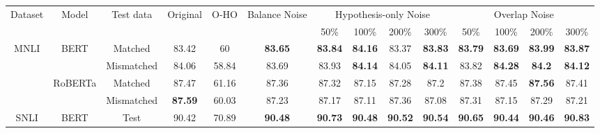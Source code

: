 \begin{table}[]
	\centering
	\scriptsize
\begin{tabular}{|c|c|c|c|c|c|c|c|c|c|c|c|c|c|}
\hline
\multirow{2}{*}{Dataset} & \multirow{2}{*}{Model}   & \multirow{2}{*}{Test data} & \multirow{2}{*}{Original} & \multirow{2}{*}{O-HO} & \multirow{2}{*}{Balance Noise} & \multicolumn{4}{c|}{Hypothesis-only Noise}                        & \multicolumn{4}{c|}{Overlap Noise}                                \\ \cline{7-14} 
                         &                          &                            &                           &                              &                                & 50\%           & 100\%          & 200\%          & 300\%          & 50\%           & 100\%          & 200\%          & 300\%          \\ \hline
\multirow{4}{*}{MNLI}    & \multirow{2}{*}{BERT}    & Matched                    & 83.42                     & 60                           & \textbf{83.65}                 & \textbf{83.84} & \textbf{84.16} & 83.37          & \textbf{83.83} & \textbf{83.79} & \textbf{83.69} & \textbf{83.99} & \textbf{83.87} \\ \cline{3-14} 
                         &                          & Mismatched                 & 84.06                     & 58.84                        & 83.69                          & 83.93          & \textbf{84.14} & 84.05          & \textbf{84.11} & 83.82          & \textbf{84.28} & \textbf{84.2}  & \textbf{84.12} \\ \cline{2-14} 
                         & \multirow{2}{*}{RoBERTa} & Matched                    & 87.47                     & 61.16                        & 87.36                          & 87.32          & 87.15          & 87.28          & 87.2           & 87.38          & 87.45          & \textbf{87.56} & 87.41          \\ \cline{3-14} 
                         &                          & Mismatched                 & \textbf{87.59}            & 60.03                        & 87.23                          & 87.17          & 87.11          & 87.36          & 87.08          & 87.31          & 87.15          & 87.29          & 87.21          \\ \hline
\multirow{2}{*}{SNLI}    & BERT                     & Test                       & 90.42                     & 70.89                        & \textbf{90.48}                 & \textbf{90.73} & \textbf{90.48} & \textbf{90.52} & \textbf{90.54} & \textbf{90.65} & \textbf{90.44} & \textbf{90.46} & \textbf{90.83} \\ \cline{2-14} 

\end{tabular}
\end{table}
